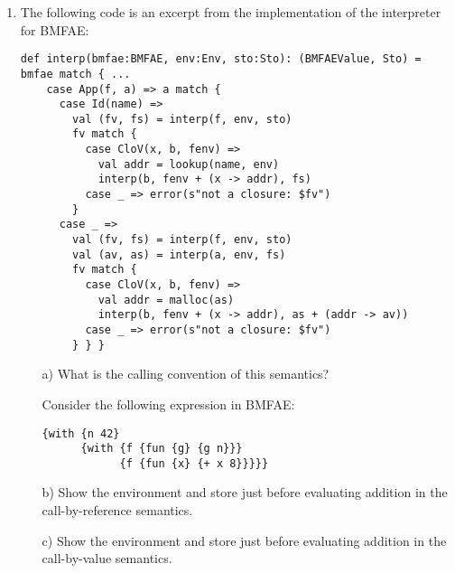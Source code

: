 \begin{enumerate}
\item The following code is an excerpt from the implementation of the interpreter for
BMFAE:
\begin{verbatim}
def interp(bmfae:BMFAE, env:Env, sto:Sto): (BMFAEValue, Sto) = bmfae match { ...
    case App(f, a) => a match {
      case Id(name) =>
        val (fv, fs) = interp(f, env, sto)
        fv match {
          case CloV(x, b, fenv) =>
            val addr = lookup(name, env)
            interp(b, fenv + (x -> addr), fs)
          case _ => error(s"not a closure: $fv")
        }
      case _ =>
        val (fv, fs) = interp(f, env, sto)
        val (av, as) = interp(a, env, fs)
        fv match {
          case CloV(x, b, fenv) =>
            val addr = malloc(as)
            interp(b, fenv + (x -> addr), as + (addr -> av))
          case _ => error(s"not a closure: $fv")
        } } }
\end{verbatim}

\begin{itemize}
  \item[a)] What is the calling convention of this semantics?

\hspace*{-2em}
Consider the following expression in BMFAE:
\begin{verbatim}
{with {n 42}
      {with {f {fun {g} {g n}}}
            {f {fun {x} {+ x 8}}}}}
\end{verbatim}

\item[b)] Show the environment and store just before evaluating addition in the call-by-reference semantics.

\item[c)] Show the environment and store just before evaluating addition in the call-by-value semantics.
\end{itemize}


\end{enumerate}
